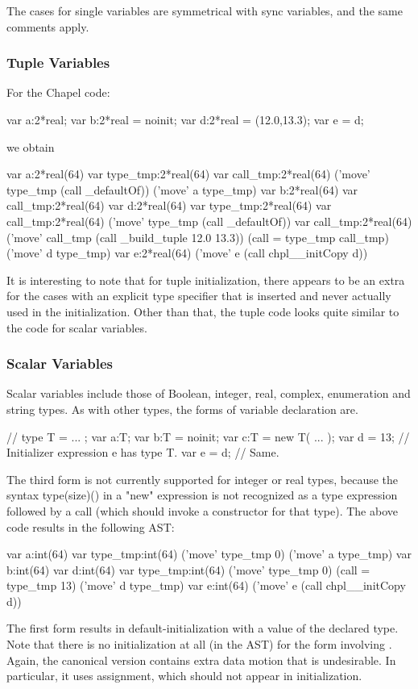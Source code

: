 The cases for single variables are symmetrical with sync variables, and the same comments
apply.

\subsubsection{Tuple Variables}

For the Chapel code:
\begin{chapel}
  var a:2*real;
  var b:2*real = noinit;
  var d:2*real = (12.0,13.3);
  var e = d;
\end{chapel}
we obtain
\begin{chapelcode}
    var a:2*real(64)
    {
      var type_tmp:2*real(64)
      var call_tmp:2*real(64)
      ('move' type_tmp (call _defaultOf))
      ('move' a type_tmp)
    }
    var b:2*real(64)
    var call_tmp:2*real(64)
    var d:2*real(64)
    {
      var type_tmp:2*real(64)
      var call_tmp:2*real(64)
      ('move' type_tmp (call _defaultOf))
      var call_tmp:2*real(64)
      ('move' call_tmp (call _build_tuple 12.0 13.3))
      (call = type_tmp call_tmp)
      ('move' d type_tmp)
    }
    var e:2*real(64)
    ('move' e (call chpl__initCopy d))
\end{chapelcode}
It is interesting to note that for tuple initialization, there appears to be an extra
 for the cases with an explicit type specifier that is inserted and never
actually used in the initialization.   Other than that, the tuple code looks quite similar
to the code for scalar variables.

\subsubsection{Scalar Variables}

Scalar variables include those of Boolean, integer, real, complex, enumeration and string
types.  As with other types, the forms of variable declaration are.
\begin{chapel}
// type T = ... ;
   var a:T;
   var b:T = noinit;
   var c:T = new T( ... );
   var d = 13; // Initializer expression e has type T.
   var e = d; // Same.
\end{chapel}
The third form is not currently supported for integer or real types, because the syntax
type(size)() in a "new" expression is not recognized as a type expression followed by a
call (which should invoke a constructor for that type).  The above code results in the
following AST:
\begin{chapelcode}
    var a:int(64)
    {
      var type_tmp:int(64)
      ('move' type_tmp 0)
      ('move' a type_tmp)
    }
    var b:int(64)
    var d:int(64)
    {
      var type_tmp:int(64)
      ('move' type_tmp 0)
      (call = type_tmp 13)
      ('move' d type_tmp)
    }
    var e:int(64)
    ('move' e (call chpl__initCopy d))
\end{chapelcode}
The first form results in default-initialization with a value of the declared type.
Note that there is no initialization at all (in the AST) for the form
involving .  Again, the canonical version contains extra data motion that
is undesirable.  In particular, it uses assignment, which should not appear in initialization.



